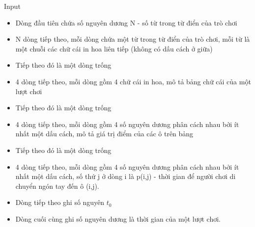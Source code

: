 Input
\begin{itemize}
	\item Dòng đầu tiên chứa số nguyên dương N - số từ trong từ điển của trò chơi
	\item N dòng tiếp theo, mỗi dòng chứa một từ trong từ điển của trò chơi, mỗi từ là một chuỗi các chữ cái in hoa liên tiếp (không có dấu cách ở giữa)
	\item Tiếp theo đó là một dòng trống
	\item 4 dòng tiếp theo, mỗi dòng gồm 4 chữ cái in hoa, mô tả bảng chữ cái của một lượt chơi
	\item Tiếp theo đó là một dòng trống
	\item 4 dòng tiếp theo, mỗi dòng gồm 4 số nguyên dương phân cách nhau bởi ít nhất một dấu cách, mô tả giá trị điểm của các ô trên bảng
	\item Tiếp theo đó là một dòng trống
	\item 4 dòng tiếp theo, mỗi dòng gồm 4 số nguyên dương phân cách nhau bởi ít nhất một dấu cách, số thứ j ở dòng i là p(i,j) - thời gian để người chơi di chuyển ngón tay đến ô (i,j).
	\item Dòng tiếp theo ghi số nguyên $t_{0}$
	\item Dòng cuối cùng ghi số nguyên dương là thời gian của một lượt chơi.
\end{itemize}